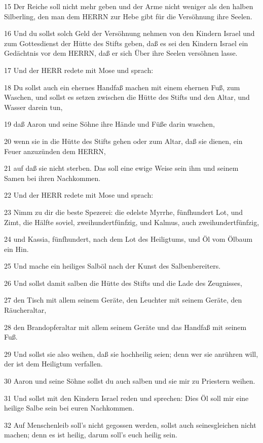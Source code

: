 \par 15 Der Reiche soll nicht mehr geben und der Arme nicht weniger als den halben Silberling, den man dem HERRN zur Hebe gibt für die Versöhnung ihre Seelen.
\par 16 Und du sollst solch Geld der Versöhnung nehmen von den Kindern Israel und zum Gottesdienst der Hütte des Stifts geben, daß es sei den Kindern Israel ein Gedächtnis vor dem HERRN, daß er sich Über ihre Seelen versöhnen lasse.
\par 17 Und der HERR redete mit Mose und sprach:
\par 18 Du sollst auch ein ehernes Handfaß machen mit einem ehernen Fuß, zum Waschen, und sollst es setzen zwischen die Hütte des Stifts und den Altar, und Wasser darein tun,
\par 19 daß Aaron und seine Söhne ihre Hände und Füße darin waschen,
\par 20 wenn sie in die Hütte des Stifts gehen oder zum Altar, daß sie dienen, ein Feuer anzuzünden dem HERRN,
\par 21 auf daß sie nicht sterben. Das soll eine ewige Weise sein ihm und seinem Samen bei ihren Nachkommen.
\par 22 Und der HERR redete mit Mose und sprach:
\par 23 Nimm zu dir die beste Spezerei: die edelste Myrrhe, fünfhundert Lot, und Zimt, die Hälfte soviel, zweihundertfünfzig, und Kalmus, auch zweihundertfünfzig,
\par 24 und Kassia, fünfhundert, nach dem Lot des Heiligtums, und Öl vom Ölbaum ein Hin.
\par 25 Und mache ein heiliges Salböl nach der Kunst des Salbenbereiters.
\par 26 Und sollst damit salben die Hütte des Stifts und die Lade des Zeugnisses,
\par 27 den Tisch mit allem seinem Geräte, den Leuchter mit seinem Geräte, den Räucheraltar,
\par 28 den Brandopferaltar mit allem seinem Geräte und das Handfaß mit seinem Fuß.
\par 29 Und sollst sie also weihen, daß sie hochheilig seien; denn wer sie anrühren will, der ist dem Heiligtum verfallen.
\par 30 Aaron und seine Söhne sollst du auch salben und sie mir zu Priestern weihen.
\par 31 Und sollst mit den Kindern Israel reden und sprechen: Dies Öl soll mir eine heilige Salbe sein bei euren Nachkommen.
\par 32 Auf Menschenleib soll's nicht gegossen werden, sollst auch seinesgleichen nicht machen; denn es ist heilig, darum soll's euch heilig sein.
